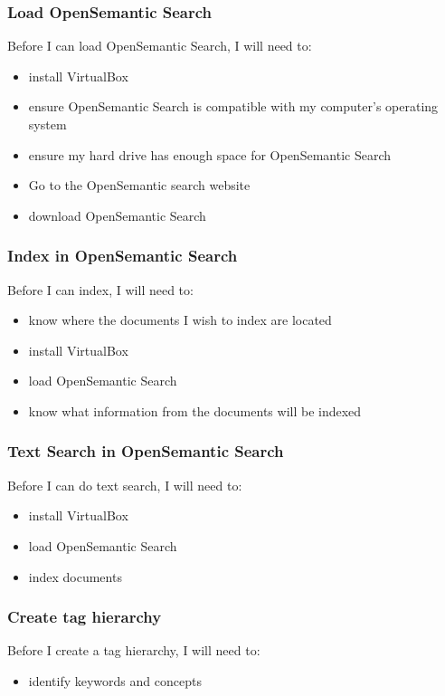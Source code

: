 \documentclass{article}
\begin{document}
\subsubsection*{Load OpenSemantic Search}

Before I can load OpenSemantic Search, I will need to:\begin{itemize}
\item install VirtualBox
\item ensure OpenSemantic Search is compatible with my computer's operating system
\item ensure my hard drive has enough space for OpenSemantic Search
\item Go to the OpenSemantic search website
\item download OpenSemantic Search
\end{itemize}

\subsubsection*{Index in OpenSemantic Search}

Before I can index, I will need to:\begin{itemize}
\item know where the documents I wish to index are located
\item install VirtualBox
\item load OpenSemantic Search
\item know what information from the documents will be indexed
\end{itemize}

\subsubsection*{Text Search in OpenSemantic Search}
Before I can do text search, I will need to:\begin{itemize}
\item install VirtualBox
\item load OpenSemantic Search
\item index documents
\end{itemize}

\subsubsection*{Create tag hierarchy}

Before I create a tag hierarchy, I will need to:
\begin{itemize}
\item identify keywords and concepts
\end{itemize}
\end{document}
